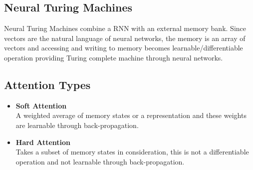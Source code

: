 \subsection{Neural Turing Machines\cite{DBLP:journals/corr/GravesWD14}}
Neural Turing Machines combine a RNN with an external memory bank. Since vectors are the natural language of neural networks, the memory is an array of vectors and accessing and writing to memory becomes learnable/differentiable operation providing Turing complete machine through neural networks.

\subsection{Attention Types}
 \begin{itemize}
     \item \textbf{Soft Attention}\\
     A weighted average of memory states or a representation and these weights are learnable through back-propagation.
     \item \textbf{Hard Attention}\\
     Takes a subset of memory states in consideration, this is not a differentiable operation and not learnable through back-propagation.
 \end{itemize} 